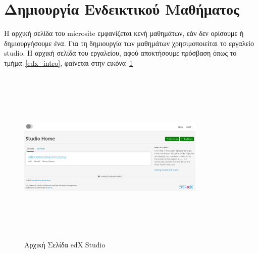 \documentclass[12pt]{report}
\begin{document}
\section{Δημιουργία Eνδεικτικού Μαθήματος}\label{studio}
Η αρχική σελίδα του \textlatin{microsite} εμφανίζεται κενή μαθημάτων, εάν δεν ορίσουμε ή δημιουργήσουμε ένα. Για τη δημιουργία των μαθημάτων χρησιμοποιείται το εργαλείο \textlatin{studio}. Η αρχική σελίδα του εργαλείου, αφού αποκτήσουμε πρόσβαση όπως το τμήμα~\ref{edx_intro}, φαίνεται στην εικόνα~\ref{fig:edx-studio-landing}
\begin{figure}[!htbp]
\centering
\includegraphics[width=0.8\textwidth, height=8.5cm]{edx-studio-landing}
\caption{Αρχική Σελίδα \textlatin{edX Studio}}
\label{fig:edx-studio-landing}
\end{figure}
\end{document}
